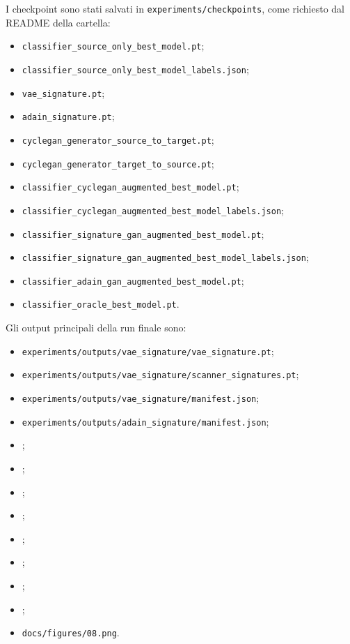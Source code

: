 \documentclass[12pt,a4paper]{article}
\begin{document}
I checkpoint sono stati salvati in \texttt{experiments/checkpoints}, come richiesto dal README della cartella:

\begin{itemize}[leftmargin=1.2cm]
\small
    \item \texttt{classifier\_source\_only\_best\_model.pt};
    \item \texttt{classifier\_source\_only\_best\_model\_labels.json};
    \item \texttt{vae\_signature.pt};
    \item \texttt{adain\_signature.pt};
    \item \texttt{cyclegan\_generator\_source\_to\_target.pt};
    \item \texttt{cyclegan\_generator\_target\_to\_source.pt};
    \item \texttt{classifier\_cyclegan\_augmented\_best\_model.pt};
    \item \texttt{classifier\_cyclegan\_augmented\_best\_model\_labels.json};
    \item \texttt{classifier\_signature\_gan\_augmented\_best\_model.pt};
    \item \texttt{classifier\_signature\_gan\_augmented\_best\_model\_labels.json};
    \item \texttt{classifier\_adain\_gan\_augmented\_best\_model.pt};
    \item \texttt{classifier\_oracle\_best\_model.pt}.
\end{itemize}

Gli output principali della run finale sono:

\begin{itemize}[leftmargin=1.2cm]
\scriptsize
    \item \texttt{experiments/outputs/vae\_signature/vae\_signature.pt};
    \item \texttt{experiments/outputs/vae\_signature/scanner\_signatures.pt};
    \item \texttt{experiments/outputs/vae\_signature/manifest.json};
    \item \texttt{experiments/outputs/adain\_signature/manifest.json};
    \item {};
    \item {};
    \item {};
    \item {};
    \item {};
    \item {};
    \item {};
    \item {};
    \item \texttt{docs/figures/08.png}.
\end{itemize}
\end{document}
